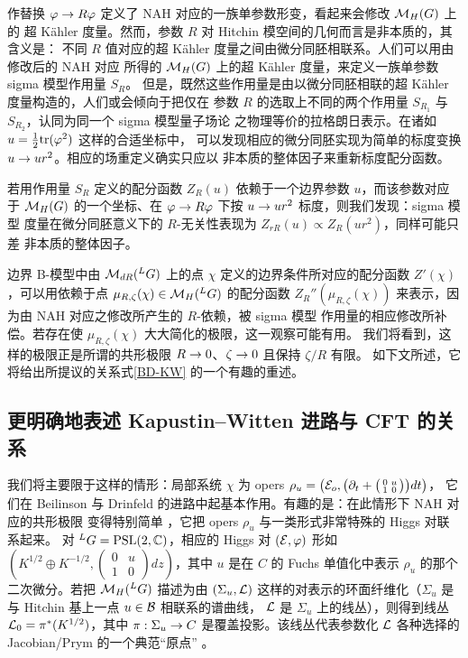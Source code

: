 作替换 $\varphi\to R\varphi$ 定义了 NAH 对应的一族单参数形变，看起来会修改 $\mathcal{M}_H(G)$ 上的
超 Kähler 度量。然而，参数 $R$ 对 Hitchin 模空间的几何而言是非本质的，其含义是：
不同 $R$ 值对应的超 Kähler 度量之间由微分同胚相联系。人们可以用由修改后的 NAH 对应
所得的 $\mathcal{M}_H(G)$ 上的超 Kähler 度量，来定义一族单参数 sigma 模型作用量 $S_R$。
但是，既然这些作用量是由以微分同胚相联的超 Kähler 度量构造的，人们或会倾向于把仅在
参数 $R$ 的选取上不同的两个作用量 $S_{R_1}$ 与 $S_{R_2}$，认同为同一个 sigma 模型量子场论
之物理等价的拉格朗日表示。在诸如 $u=\frac{1}{2}\mathrm{tr}(\varphi^2)$ 这样的合适坐标中，
可以发现相应的微分同胚实现为简单的标度变换 $u\to ur^{2}$。相应的场重定义确实只应以
非本质的整体因子来重新标度配分函数。

若用作用量 $S_R$ 定义的配分函数 $Z_R(u)$ 依赖于一个边界参数 $u$，而该参数对应于
$\mathcal{M}_H(G)$ 的一个坐标、在 $\varphi\to R\varphi$ 下按 $u\to ur^{2}$ 标度，则我们发现：sigma 模型
度量在微分同胚意义下的 $R$-无关性表现为 $Z_{r R}(u)\propto Z_R(ur^{2})$，同样可能只差
非本质的整体因子。

边界 B-模型中由 $\mathcal{M}_{dR}({}^LG)$ 上的点 $\chi$ 定义的边界条件所对应的配分函数
$Z'(\chi)$，可以用依赖于点 $\mu_{R,\zeta}(\chi) \in \mathcal{M}_{H}({}^LG)$ 的配分函数
$Z_R''(\mu_{R,\zeta}(\chi))$ 来表示，因为由 NAH 对应之修改所产生的 $R$-依赖，被 sigma 模型
作用量的相应修改所补偿。若存在使 $\mu_{R,\zeta}(\chi)$ 大大简化的极限，这一观察可能有用。
我们将看到，这样的极限正是所谓的共形极限 $R\to 0$、$\zeta\to 0$ 且保持 $\zeta/R$ 有限。
如下文所述，它将给出所提议的关系式\eqref{BD-KW} 的一个有趣的重述。

\subsection{更明确地表述 Kapustin--Witten 进路与 CFT 的关系}

我们将主要限于这样的情形：局部系统 $\chi$ 为 opers
$\rho_u=\big(\mathcal{E}_o,\big(\partial_t+\big(\begin{smallmatrix} 0& u\\ 1 & 0\end{smallmatrix}\big)\big)dt\big)$，
它们在 Beilinson 与 Drinfeld 的进路中起基本作用。有趣的是：在此情形下 NAH 对应的共形极限
变得特别简单 \cite{DFKMMN}，它把 opers $\rho_u$ 与一类形式非常特殊的 Higgs 对联系起来。
对 ${}^L G=\mathrm{PSL}(2,\mathbb{C})$，相应的 Higgs 对 $(\mathcal{E},\varphi)$ 形如
$(K^{1/2}\oplus K^{-1/2},(\begin{smallmatrix} 0& u \\ 1 &0\end{smallmatrix})dz)$，其中 $u$
是在 $C$ 的 Fuchs 单值化中表示 $\rho_u$ 的那个二次微分。若把 $\mathcal{M}_H({}^L G)$ 描述为由
$(\Sigma_u,\mathcal{L})$ 这样的对表示的环面纤维化（$\Sigma_u$ 是与 Hitchin 基上一点 $u\in\mathcal{B}$ 相联系的谱曲线，
$\mathcal{L}$ 是 $\Sigma_u$ 上的线丛），则得到线丛 $\mathcal{L}_0=\pi^*(K^{1/2})$，其中 $\pi: \Sigma_u\to C$
是覆盖投影。该线丛代表参数化 $\mathcal{L}$ 各种选择的 Jacobian/Prym 的一个典范“原点” \cite{W15}。

